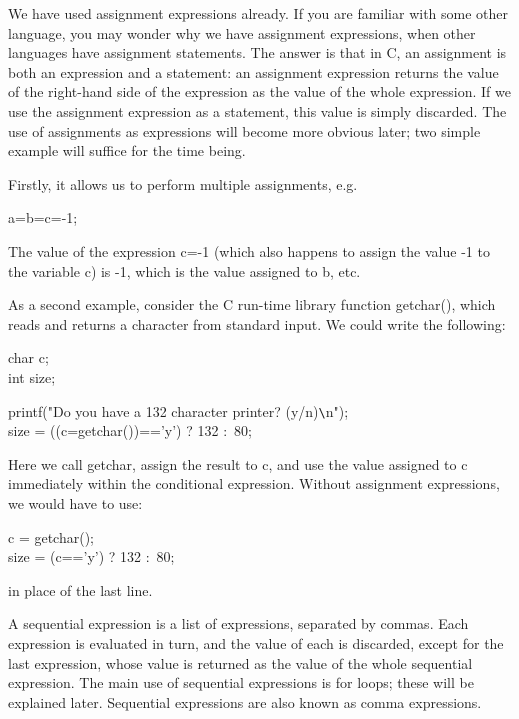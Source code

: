 \noindent
     We have  used {\kc assignment expressions\/} 
already.  If you 
are familiar with some other  language, you  may wonder why we have
assignment expressions, when other languages  have assignment 
statements. The  answer is  that  in  C,  an assignment is  both an 
expression and  a statement:  an assignment expression returns the
value of the right-hand side of the expression as the value of the
whole expression.  If we  use the  assignment expression  as a
statement, this value is  simply discarded.  The use of assignments
as expressions will become more obvious later; two simple example will
suffice for the time being.  

Firstly, it allows us to perform multiple assignments, e.g.\
\begin{code}
a=b=c=-1;
\end{code}
\noindent
The value of the expression {\cd c=-1} (which also happens to assign
the value -1 to the variable {\cd c}) is -1, which is the value
assigned to {\cd b}, etc.

As a second example, consider the C run-time library 
function {\cd getchar()}, which reads and returns a character from
standard input. We could write the following:
\begin{code}
    char c; \\
    int size; \addVspace

	 printf("Do you have a 132 character printer? (y/n)\verb+\+n"); \\
    size = ((c=getchar())=='y') ? 132 :\ 80;
\end{code}
\noindent
     Here we  call {\cd getchar}, assign the result to {\cd c}, and
use the value assigned to  {\cd c}  immediately  within  the 
conditional  expression.  Without  assignment expressions, we would
have to use:
\begin{code}
         c = getchar(); \\
         size = (c=='y') ? 132 :\ 80;
\end{code}
\noindent
     in place of the last line.

     A {\kc sequential  expression\/} is  a list  of expressions,
separated by commas.  Each expression  is evaluated in turn, and the
value of each is discarded, except for the  last expression,  whose
value  is returned  as the value of the whole sequential expression. 
The main  use of  sequential expressions is for loops; these will  be
explained later. Sequential expressions are also known as {\kc comma
expressions}.


